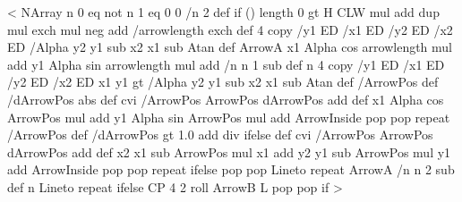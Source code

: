 %
\def\arrowType@H{H}
<
  NArray n 0 eq not { n 1 eq { 0 0 /n 2 def } if
  (\psk@ArrowInside) length 0 gt { 
    \ifx\psk@arrowA\arrowType@H   %
      \pst@number\pshooklength  %
    \else
      \psk@arrowsize\space CLW mul add dup \psk@arrowlength\space mul exch \psk@arrowinset mul neg add  
    \fi
    /arrowlength exch def 
    4 copy 				%
    /y1 ED /x1 ED /y2 ED /x2 ED 	%
    /Alpha y2 y1 sub x2 x1 sub Atan def %
    ArrowA 				%
    x1 Alpha cos arrowlength mul add	%
    y1 Alpha sin arrowlength mul add	%
    /n n 1 sub def
    n {
      4 copy
      /y1 ED /x1 ED /y2 ED /x2 ED
      x1 y1
      \psk@ArrowInsidePos{} gt {
        /Alpha y2 y1 sub x2 x1 sub Atan def
        /ArrowPos \psk@ArrowInsideOffset\space def
        /dArrowPos \psk@ArrowInsidePos\space abs def
        \psk@ArrowInsideNo\space cvi {
          /ArrowPos ArrowPos dArrowPos add def
          x1 Alpha cos ArrowPos mul add
          y1 Alpha sin ArrowPos mul add
          ArrowInside
          pop pop
        } repeat
      }{
        /ArrowPos \psk@ArrowInsideOffset\space def
        /dArrowPos  gt {%
          1.0  add div
        }{\psk@ArrowInsidePos } ifelse def
          \psk@ArrowInsideNo\space cvi {
            /ArrowPos ArrowPos dArrowPos add def
            x2 x1 sub ArrowPos mul x1 add
            y2 y1 sub ArrowPos mul y1 add
            ArrowInside
            pop pop
          } repeat
      } ifelse
      pop pop Lineto
    } repeat
  }{ ArrowA /n n 2 sub def n { Lineto } repeat } ifelse
  CP 4 2 roll ArrowB L pop pop } if >
%
